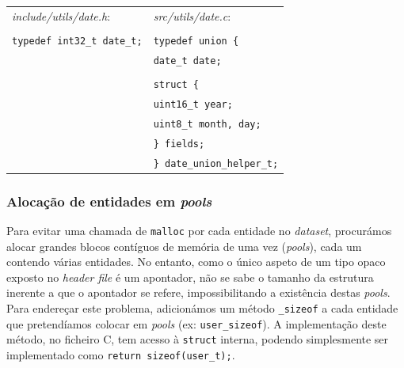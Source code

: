 \documentclass[12pt, a4paper]{article}
\begin{document}
\begin{spacing}{1}
\begin{center}
    \begin{tabular}{ |l|l| }
        \hline
        \emph{include/utils/date.h}: & \emph{src/utils/date.c}: \\
		& \\
		\texttt{typedef int32\_t date\_t;} & \texttt{typedef union \{} \\
										   & \texttt{\hspace{0.5cm}date\_t date;} \\
                                           & \texttt{} \\
                                           & \texttt{\hspace{0.5cm}struct \{} \\
                                           & \texttt{\hspace{1cm}uint16\_t year;} \\
                                           & \texttt{\hspace{1cm}uint8\_t month, day;} \\
                                           & \texttt{\hspace{0.5cm}\} fields;} \\
                                           & \texttt{\} date\_union\_helper\_t;} \\
        \hline
    \end{tabular}
\end{center}
\end{spacing}

\subsubsection{Alocação de entidades em \emph{pools}}

Para evitar uma chamada de \texttt{malloc} por cada entidade no \emph{dataset}, procurámos alocar
grandes blocos contíguos de memória de uma vez (\emph{pools}), cada um contendo várias entidades.
No entanto, como o único aspeto de um tipo opaco exposto no \emph{header file} é um apontador, não
se sabe o tamanho da estrutura inerente a que o apontador se refere, impossibilitando a existência
destas \emph{pools}. Para endereçar este problema, adicionámos um método \texttt{\_sizeof} a cada
entidade que pretendíamos colocar em \emph{pools} (ex: \texttt{user\_sizeof}). A implementação
deste método, no ficheiro C, tem acesso à \texttt{struct} interna, podendo simplesmente ser
implementado como \texttt{return sizeof(user\_t);}.
\end{document}
